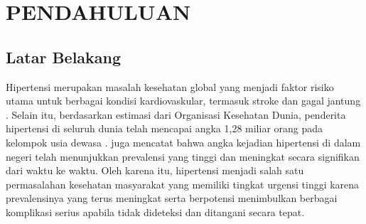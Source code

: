 \cleardoublepage %
\chapter{PENDAHULUAN}
\label{chap:pendahuluan}

\section{Latar Belakang}
Hipertensi merupakan masalah kesehatan global yang menjadi faktor risiko utama untuk berbagai kondisi kardiovaskular, termasuk stroke dan gagal jantung \autocite{Mills2020Global}. Selain itu, berdasarkan estimasi dari Organisasi Kesehatan Dunia, penderita hipertensi di seluruh dunia telah mencapai angka 1,28 miliar orang pada kelompok usia dewasa \autocite{WHO2023}. \textcite{ri2018} juga mencatat bahwa angka kejadian hipertensi di dalam negeri telah menunjukkan prevalensi yang tinggi dan meningkat secara signifikan dari waktu ke waktu. Oleh karena itu, hipertensi menjadi salah satu permasalahan kesehatan masyarakat yang memiliki tingkat urgensi tinggi karena prevalensinya yang terus meningkat serta berpotensi menimbulkan berbagai komplikasi serius apabila tidak dideteksi dan ditangani secara tepat.



